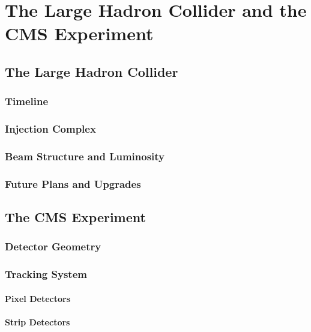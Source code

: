 \chapter{The Large Hadron Collider and the CMS Experiment}
\label{chap:lhc_cms}


    \section{The Large Hadron Collider}

        \subsection{Timeline}

        \subsection{Injection Complex}

        \subsection{Beam Structure and Luminosity}

        \subsection{Future Plans and Upgrades}

    \section{The CMS Experiment}

        \subsection{Detector Geometry}

        \subsection{Tracking System}

            \subsubsection{Pixel Detectors}

            \subsubsection{Strip Detectors}

